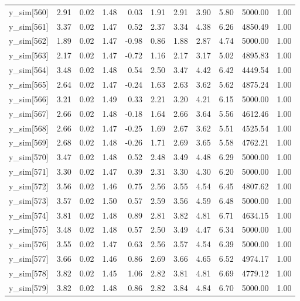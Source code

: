\begin{table}[ht]
\begin{tabular}{rrrrrrrrrrr}
  y\_sim[560] & 2.91 & 0.02 & 1.48 & 0.03 & 1.91 & 2.91 & 3.90 & 5.80 & 5000.00 & 1.00 \\ 
  y\_sim[561] & 3.37 & 0.02 & 1.47 & 0.52 & 2.37 & 3.34 & 4.38 & 6.26 & 4850.49 & 1.00 \\ 
  y\_sim[562] & 1.89 & 0.02 & 1.47 & -0.98 & 0.86 & 1.88 & 2.87 & 4.74 & 5000.00 & 1.00 \\ 
  y\_sim[563] & 2.17 & 0.02 & 1.47 & -0.72 & 1.16 & 2.17 & 3.17 & 5.02 & 4895.83 & 1.00 \\ 
  y\_sim[564] & 3.48 & 0.02 & 1.48 & 0.54 & 2.50 & 3.47 & 4.42 & 6.42 & 4449.54 & 1.00 \\ 
  y\_sim[565] & 2.64 & 0.02 & 1.47 & -0.24 & 1.63 & 2.63 & 3.62 & 5.62 & 4875.24 & 1.00 \\ 
  y\_sim[566] & 3.21 & 0.02 & 1.49 & 0.33 & 2.21 & 3.20 & 4.21 & 6.15 & 5000.00 & 1.00 \\ 
  y\_sim[567] & 2.66 & 0.02 & 1.48 & -0.18 & 1.64 & 2.66 & 3.64 & 5.56 & 4612.46 & 1.00 \\ 
  y\_sim[568] & 2.66 & 0.02 & 1.47 & -0.25 & 1.69 & 2.67 & 3.62 & 5.51 & 4525.54 & 1.00 \\ 
  y\_sim[569] & 2.68 & 0.02 & 1.48 & -0.26 & 1.71 & 2.69 & 3.65 & 5.58 & 4762.21 & 1.00 \\ 
  y\_sim[570] & 3.47 & 0.02 & 1.48 & 0.52 & 2.48 & 3.49 & 4.48 & 6.29 & 5000.00 & 1.00 \\ 
  y\_sim[571] & 3.30 & 0.02 & 1.47 & 0.39 & 2.31 & 3.30 & 4.30 & 6.20 & 5000.00 & 1.00 \\ 
  y\_sim[572] & 3.56 & 0.02 & 1.46 & 0.75 & 2.56 & 3.55 & 4.54 & 6.45 & 4807.62 & 1.00 \\ 
  y\_sim[573] & 3.57 & 0.02 & 1.50 & 0.57 & 2.59 & 3.56 & 4.59 & 6.48 & 5000.00 & 1.00 \\ 
  y\_sim[574] & 3.81 & 0.02 & 1.48 & 0.89 & 2.81 & 3.82 & 4.81 & 6.71 & 4634.15 & 1.00 \\ 
  y\_sim[575] & 3.48 & 0.02 & 1.48 & 0.57 & 2.50 & 3.49 & 4.47 & 6.34 & 5000.00 & 1.00 \\ 
  y\_sim[576] & 3.55 & 0.02 & 1.47 & 0.63 & 2.56 & 3.57 & 4.54 & 6.39 & 5000.00 & 1.00 \\ 
  y\_sim[577] & 3.66 & 0.02 & 1.46 & 0.86 & 2.69 & 3.66 & 4.65 & 6.52 & 4974.17 & 1.00 \\ 
  y\_sim[578] & 3.82 & 0.02 & 1.45 & 1.06 & 2.82 & 3.81 & 4.81 & 6.69 & 4779.12 & 1.00 \\ 
  y\_sim[579] & 3.82 & 0.02 & 1.48 & 0.86 & 2.82 & 3.84 & 4.84 & 6.70 & 5000.00 & 1.00 \\ 

\end{tabular}
\end{table}
